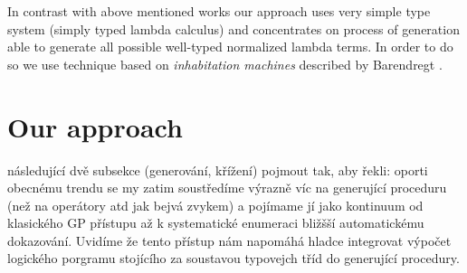 \documentclass[11pt]{article}
\newcommand{\red}[1]{{\color{red} #1}}
\begin{document}
\begin{article}
In contrast with above mentioned works our approach uses very simple type system 
(simply typed lambda calculus) and concentrates on process of generation  
able to generate all possible well-typed normalized lambda terms. In order to do
so we use technique based on \textit{inhabitation machines} 
described by Barendregt \cite{barendregt10}.    






\section{Our approach}

\red{následující dvě subsekce (generování, křížení) pojmout tak, aby řekli: oporti obecnému trendu se my  zatim soustředíme výrazně víc na generující proceduru (než na operátory atd jak bejvá zvykem) a pojímame jí jako kontinuum od klasického GP přístupu až k systematické enumeraci bližšší automatickému dokazování. Uvidíme že tento přístup nám napomáhá hladce integrovat výpočet logického porgramu stojícího za soustavou typovejch tříd do generující procedury. }



\end{article}
\end{document}
